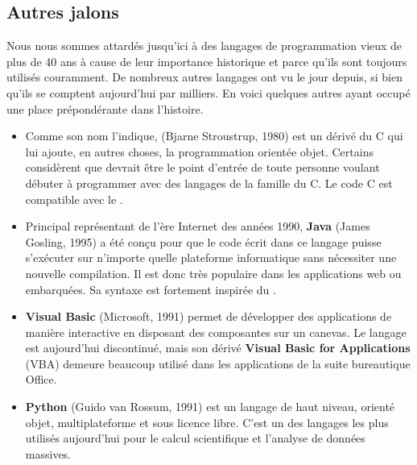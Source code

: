 
\subsection{Autres jalons}
\label{sec:informatique:historique:autres}

Nous nous sommes attardés jusqu'ici à des langages de programmation
vieux de plus de 40 ans à cause de leur importance historique et parce
qu'ils sont toujours utilisés couramment. De nombreux autres langages
ont vu le jour depuis, si bien qu'ils se comptent aujourd'hui par
milliers. En voici quelques autres ayant occupé une place
prépondérante dans l'histoire.

\begin{itemize}
\item Comme son nom l'indique, \textbf{\Cpp} (Bjarne
  Stroustrup, 1980) est un dérivé du C qui lui ajoute, en autres
  choses, la programmation orientée objet. Certains considèrent que
  {\Cpp} devrait être le point d'entrée de toute personne voulant
  débuter à programmer avec des langages de la famille du C. Le code C
  est compatible avec le \Cpp.
\item Principal représentant de l'ère Internet des années 1990,
  \textbf{Java} (James Gosling, 1995) a été conçu pour
  que le code écrit dans ce langage puisse s'exécuter sur n'importe
  quelle plateforme informatique sans nécessiter une nouvelle
  compilation. Il est donc très populaire dans les applications web ou
  embarquées. Sa syntaxe est fortement inspirée du \Cpp.
\item {}\textbf{Visual Basic} (Microsoft, 1991)
  permet de développer des applications de manière interactive en
  disposant des composantes sur un canevas. Le langage est aujourd'hui
  discontinué, mais son dérivé \textbf{Visual Basic for Applications}
  (VBA) demeure beaucoup utilisé dans les applications de
  la suite bureautique Office.
\item {}\textbf{Python} (Guido van Rossum, 1991) est un
  langage de haut niveau, orienté objet, multiplateforme et sous
  licence libre. C'est un des langages les plus utilisés aujourd'hui
  pour le calcul scientifique et l'analyse de données massives.
\end{itemize}

